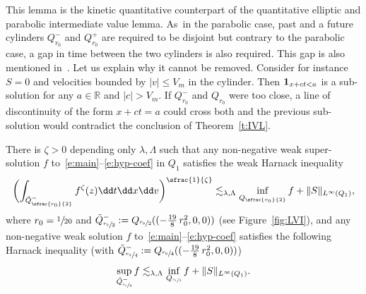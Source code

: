 \begin{remark}
\label{rem:gap}
This lemma is the kinetic quantitative counterpart of the
quantitative elliptic \cite{DG56,DG57,vasseur} and parabolic
\cite{gueDGhalv2} intermediate value lemma. As~in the
parabolic case, past and a future cylinders $Q_{r_0}^{-}$ and
$Q_{r_0}^{+}$ are required to be disjoint but contrary to the
parabolic case, a gap in time between the two cylinders is also
required. This gap is also mentioned in~\cite{gimv,AP20}. Let
us explain why it cannot be removed. Consider for instance
$S=0$ and velocities bounded by $|v| \le V_m$ in the
cylinder. Then ${\bf 1}_{x+ct<a}$ is a sub-solution for any
$a\in \mathbb{R}$ and $|c|>V_m$. If $Q_{r_0}^{-}$ and $Q_{r_0}$
were too close, a line of discontinuity of the form $x+ct=a$
could cross both and the previous sub-solution would contradict
the conclusion of Theorem~\ref{t:IVL}.
\end{remark}

\begin{theorem}
\label{t:harnack}
There is $\zeta >0$ depending only $\lambda,\Lambda$ such that
any non-negative weak super-solution $f$
to~\eqref{e:main}--\eqref{e:hyp-coef} in $Q_1$ satisfies the
weak Harnack inequality\vspace*{-3pt}
\begin{equation}
\label{eq:w-Harnack-stat}
\biggl( \int_{\tilde Q_{\sfrac{r_0}{2}}^-} f^\zeta (z) \dd t \dd x \dd v
\biggr)^{\sfrac{1}{\zeta}}
\lesssim_{\lambda,\Lambda} \inf_{ Q_{\sfrac{r_0}{2}}}f
+ \|S\|_{L^\infty (Q_1)},
\end{equation}
where $r_0=\sfrac{1}{20}$ and
$\tilde Q_{\sfrac{r_0}{2}}
^{-}:=Q_{\sfrac{r_0}{2}}((-\frac{19}{8}\,r_0^2,0,0))$ (see
Figure~\ref{fig:LVI}), and any non-negative weak solution $f$
to~\eqref{e:main}--\eqref{e:hyp-coef} satisfies the following
Harnack inequality (with
$\tilde
Q_{\sfrac{r_0}{4}}^{-}:=Q_{\sfrac{r_0}{4}}((-\frac{19}{8}\,r_0^2,0,0))$)\vspace*{-3pt}
\begin{equation}
\label{eq:s-Harnack-stat}
\sup_{\tilde Q_{\sfrac{r_0}{4}}^{-}} f \lesssim_{\lambda,\Lambda}
\inf_{Q_{\sfrac{r_0}{4}}} f + \| S \|_{L^\infty(Q_1)}.
\end{equation}
\end{theorem}

